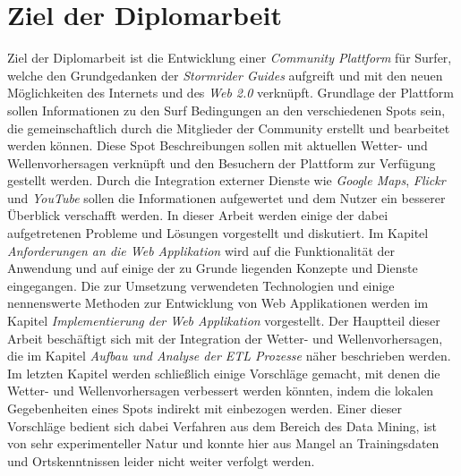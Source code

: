 \section{Ziel der Diplomarbeit}
Ziel der Diplomarbeit ist die Entwicklung einer \textit{Community
  Plattform} für Surfer, welche den Grundgedanken der
\textit{Stormrider Guides} aufgreift und mit den neuen Möglichkeiten
des Internets und des \textit{Web 2.0} verknüpft. Grundlage der
Plattform sollen Informationen zu den Surf Bedingungen an den
verschiedenen Spots sein, die gemeinschaftlich durch die Mitglieder
der Community erstellt und bearbeitet werden können. Diese Spot
Beschreibungen sollen mit aktuellen Wetter- und Wellenvorhersagen
verknüpft und den Besuchern der Plattform zur Verfügung gestellt
werden. Durch die Integration externer Dienste wie \textit{Google
  Maps}, \textit{Flickr} und \textit{YouTube} sollen die Informationen
aufgewertet und dem Nutzer ein besserer Überblick verschafft
werden. In dieser Arbeit werden einige der dabei aufgetretenen
Probleme und Lösungen vorgestellt und diskutiert. Im Kapitel
\textit{Anforderungen an die Web Applikation} wird auf die
Funktionalität der Anwendung und auf einige der zu Grunde liegenden
Konzepte und Dienste eingegangen. Die zur Umsetzung verwendeten
Technologien und einige nennenswerte Methoden zur Entwicklung von Web
Applikationen werden im Kapitel \textit{Implementierung der Web
  Applikation} vorgestellt. Der Hauptteil dieser Arbeit beschäftigt
sich mit der Integration der Wetter- und Wellenvorhersagen, die im
Kapitel \textit{Aufbau und Analyse der ETL Prozesse} näher beschrieben
werden. Im letzten Kapitel werden schließlich einige Vorschläge
gemacht, mit denen die Wetter- und Wellenvorhersagen verbessert werden
könnten, indem die lokalen Gegebenheiten eines Spots indirekt mit
einbezogen werden. Einer dieser Vorschläge bedient sich dabei
Verfahren aus dem Bereich des Data Mining, ist von sehr
experimenteller Natur und konnte hier aus Mangel an Trainingsdaten und
Ortskenntnissen leider nicht weiter verfolgt werden.

